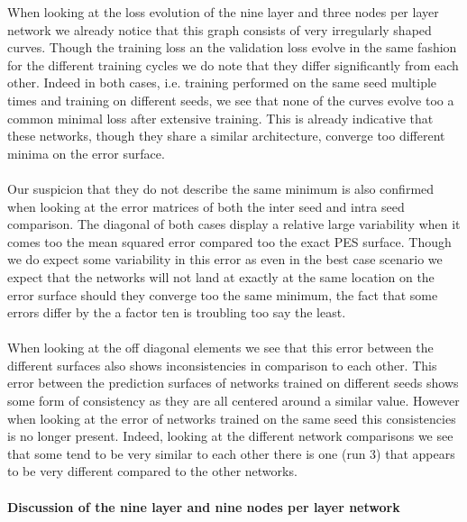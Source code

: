 \documentclass[]{article}
\begin{document}
When looking at the loss evolution of the nine layer and three nodes per layer network we already notice that this graph consists of very irregularly shaped curves. Though the training loss an the validation loss evolve in the same fashion for the different training cycles we do note that they differ significantly from each other. Indeed in both cases, i.e. training performed on the same seed multiple times and training on different seeds, we see that none of the curves evolve too a common minimal loss after extensive training. This is already indicative that these networks, though they share a similar architecture, converge too different minima on the error surface.
\\
\\
Our suspicion that they do not describe the same minimum is also confirmed when looking at the error matrices of both the inter seed and intra seed comparison. The diagonal of both cases display a relative large variability when it comes too the mean squared error compared too the exact PES surface. Though we do expect some variability in this error as even in the best case scenario we expect that the networks will not land at exactly at the same location on the error surface should they converge too the same minimum, the fact that some errors differ by the a factor ten is troubling too say the least.
\\
\\
When looking at the off diagonal elements we see that this error between the different surfaces also shows inconsistencies in comparison to each other. This error between the prediction surfaces of networks trained on different seeds shows some form of consistency as they are all centered around a similar value. However when looking at the error of networks trained on the same seed this consistencies is no longer present. Indeed, looking at the different network comparisons we see that some tend to be very similar to each other there is one (run 3) that appears to be very different compared to the other networks.

\paragraph{Discussion of the nine layer and nine nodes per layer network}
\end{document}

